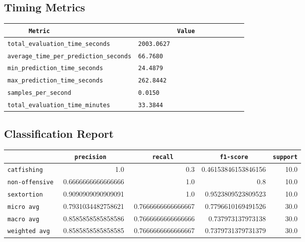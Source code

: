 \documentclass{article}
\begin{document}
\subsection{Timing Metrics}

\begin{center}
\begin{tabular}{l | l} \hline
    \verb|      Metric     | & \verb|           Value           | \\ \hline
    \hline
    \verb|total_evaluation_time_seconds| & \verb|2003.0627                    | \\ \hline
    \verb|average_time_per_prediction_seconds| & \verb|66.7680                      | \\ \hline
    \verb|min_prediction_time_seconds| & \verb|24.4879                      | \\ \hline
    \verb|max_prediction_time_seconds| & \verb|262.8442                     | \\ \hline
    \verb|samples_per_second| & \verb|0.0150                       | \\ \hline
    \verb|total_evaluation_time_minutes| & \verb|33.3844                      | \\ \hline
\end{tabular}
\end{center}

\subsection{Classification Report}

\begin{center}
\begin{tabular}{l | r | r | r | r} \hline
    \verb|            | & \verb|    precision     | & \verb|      recall      | & \verb|     f1-score     | & \verb|support| \\ \hline
    \hline
    \verb|catfishing | & 1.0 & 0.3 & 0.46153846153846156 &    10.0 \\ \hline
    \verb|non-offensive| & 0.6666666666666666 & 1.0 & 0.8 &    10.0 \\ \hline
    \verb|sextortion | & 0.9090909090909091 & 1.0 & 0.9523809523809523 &    10.0 \\ \hline
    \verb|micro avg  | & 0.7931034482758621 & 0.7666666666666667 & 0.7796610169491526 &    30.0 \\ \hline
    \verb|macro avg  | & 0.8585858585858586 & 0.7666666666666666 & 0.737973137973138 &    30.0 \\ \hline
    \verb|weighted avg| & 0.8585858585858585 & 0.7666666666666667 & 0.7379731379731379 &    30.0 \\ \hline
\end{tabular}
\end{center}
\end{document}

